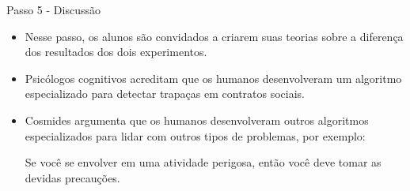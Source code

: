 \documentclass{beamer}
\begin{document}
\begin{frame}{Passo 5 - Discussão}

\begin{itemize}

\item<1-> Nesse passo, os alunos são convidados a criarem suas teorias sobre a diferença dos resultados dos dois experimentos.

\item<2-> Psicólogos cognitivos acreditam que os humanos desenvolveram um algoritmo especializado para detectar trapaças em contratos sociais.

\item<3-> Cosmides argumenta que os humanos desenvolveram outros algoritmos especializados para lidar com outros tipos de problemas, por exemplo:


Se você se envolver em uma atividade perigosa,
então você deve tomar as devidas precauções.


\end{itemize}


\end{frame}







\end{document}

